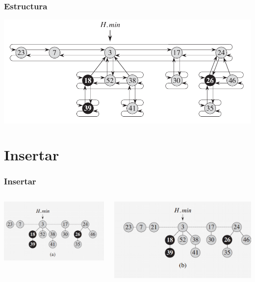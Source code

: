 \documentclass{beamer}
\begin{document}
\begin{frame}
  \frametitle{Estructura}
  \includegraphics[width =1 \textwidth]{img/estructura.png}
\end{frame}

\section{Insertar}
\begin{frame}
  \frametitle{Insertar}
  \begin{columns}[t]
    \includegraphics[width =1 \textwidth]{imagenes/insertar1.png}
      
    \includegraphics[width =1 \textwidth]{imagenes/insertar2.png}

   \end{columns}
  
\end{frame}
\end{document}
